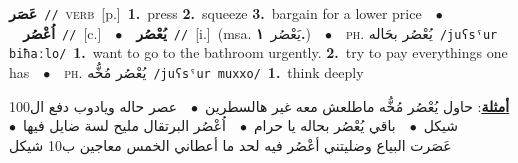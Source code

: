\documentclass[10pt,a4paper,twoside]{article} %
\begin{document}
\begin{multicols}{2}
{\setlength\topsep{0pt}\textbf{\foreignlanguage{arabic}{عَصَر}}\ {\color{gray}\texttt{//}\color{black}}\ \textsc{verb}\ [p.]\ \textbf{1.}~press  \textbf{2.}~squeeze  \textbf{3.}~bargain for a lower price\ \ $\bullet$\ \ \setlength\topsep{0pt}\textbf{\foreignlanguage{arabic}{اُعْصُر}}\ {\color{gray}\texttt{//}\color{black}}\ [c.]\ \ $\bullet$\ \ \setlength\topsep{0pt}\textbf{\foreignlanguage{arabic}{يُعْصُر}}\ {\color{gray}\texttt{//}\color{black}}\ [i.]\ \color{gray}(msa. \foreignlanguage{arabic}{يَعْصُر}~\foreignlanguage{arabic}{\textbf{١.}})\color{black}\ \ $\bullet$\ \ \textsc{ph.} \color{gray} \foreignlanguage{arabic}{يُعْصُر بحَاله}\color{black}\ {\color{gray}\texttt{/{\sffamily juʕsˤur biħaːlo}/}\color{black}}\ \textbf{1.}~want to go to the bathroom urgently.  \textbf{2.}~try to pay everythings one has\ \ $\bullet$\ \ \textsc{ph.} \color{gray} \foreignlanguage{arabic}{يُعْصُر مُخُّه}\color{black}\ {\color{gray}\texttt{/{\sffamily juʕsˤur muxxo}/}\color{black}}\ \textbf{1.}~think deeply\  \begin{flushright}\color{gray}\foreignlanguage{arabic}{\textbf{\underline{\foreignlanguage{arabic}{أمثلة}}}: حاول يُعْصُر مُخُّه ماطلعش معه غير هالسطرين\ $\bullet$\ \  عصر حاله ويادوب دفع ال100 شيكل\ $\bullet$\ \  باقي يُعْصُر بحاله يا حرام\ $\bullet$\ \  اُعْصُر البرتقال مليح لسة ضايل فيها\ $\bullet$\ \  عَصَرت البياع وضليتني أعْصُر فيه لحد ما أعطاني الخمس معاجين ب10 شيكل}\end{flushright}\color{black}} \vspace{2mm}


\end{multicols}
\end{document}
